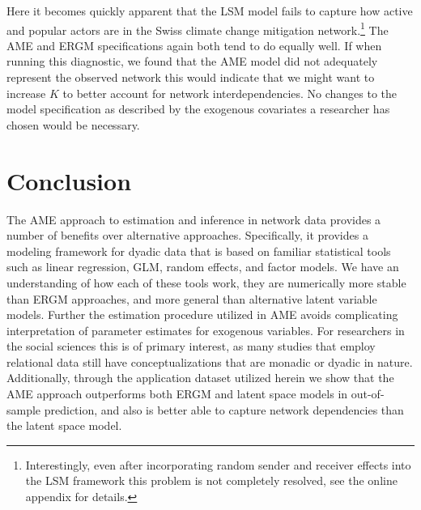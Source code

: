 \documentclass[9pt,twocolumn,twoside,lineno]{pnas-new}
\begin{document}
Here it becomes quickly apparent that the LSM model fails to capture how active and popular actors are in the Swiss climate change mitigation network.\footnote{Interestingly, even after incorporating random sender and receiver effects into the LSM framework this problem is not completely resolved, see the online appendix for details.} The AME and ERGM specifications again both tend to do equally well. If when running this diagnostic, we found that the AME model did not adequately represent the observed network this would indicate that we might want to increase $K$ to better account for network interdependencies. No changes to the model specification as described by the exogenous covariates a researcher has chosen would be necessary. %

\section*{\textbf{Conclusion}}

The AME approach to estimation and inference in network data provides a number of benefits over alternative approaches. Specifically, it provides a modeling framework for dyadic data that is based on familiar statistical tools such as linear regression, GLM, random effects, and factor models. We have an understanding of how each of these tools work, they are numerically more stable than ERGM approaches, and more general than alternative latent variable models. Further the estimation procedure utilized in AME avoids complicating interpretation of parameter estimates for exogenous variables. For researchers in the social sciences this is of primary interest, as many studies that employ relational data still have conceptualizations that are monadic or dyadic in nature. Additionally, through the application dataset utilized herein we show that the AME approach outperforms both ERGM and latent space models in out-of-sample prediction, and also is better able to capture network dependencies than the latent space model.
\end{document}
